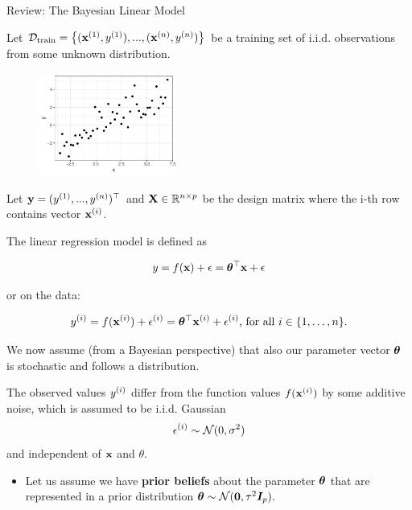 \begin{frame}[c, allowframebreaks]{Review: The Bayesian Linear Model}

Let $\mathcal{D}_{\text{train}} = \left\{(\mathbf{x}^{(1)},y^{(1)}), ..., (\mathbf{x}^{(n)},y^{(n)})\right\}$ be a training set of i.i.d. observations from some unknown distribution.
\begin{figure}
  \includegraphics[width=0.4\textwidth]{figure_man/bayes-lm/example.pdf}
\end{figure}

Let $\textbf{y} = (y^{(1)}, ..., y^{(n)})^\top$ and $\mathbf{X} \in \mathbb{R}^{n \times p}$ be the design matrix where the i-th row contains vector $\mathbf{x}^{(i)}$. 





\framebreak

The linear regression model is defined as

$$
y = f(\mathbf{x}) + \epsilon = \bm{\theta}^\top \mathbf{x} + \epsilon 
$$

or on the data:

$$
y^{(i)} = f(\mathbf{x}^{(i)}) + \epsilon^{(i)} = \bm{\theta}^\top \mathbf{x}^{(i)} + \epsilon^{(i)} \text{, for all } i \in \{1,\dots,n\}.
$$

\lz 
We now assume (from a Bayesian perspective) that also our parameter vector $\bm{\theta}$ is stochastic and follows a distribution.

The observed values $y^{(i)}$ differ from the function values $f(\mathbf{x}^{(i)})$ by some additive noise, which is assumed to be i.i.d. Gaussian 
$$\epsilon^{(i)} \sim \mathcal{N} (0, \sigma^2)$$
and independent of $\mathbf{x}$ and $\theta$.


\framebreak

\begin{itemize}
  \item Let us assume we have \textbf{prior beliefs} about the parameter $\bm{\theta}$ that are represented in a prior distribution $\bm{\theta} \sim \mathcal{N} (\mathbf{0}, \tau^2 \boldsymbol{I}_p).$


\end{itemize}
\end{frame}
